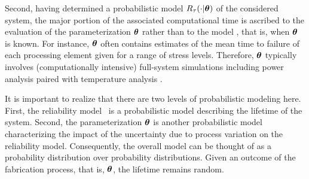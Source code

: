 Second, having determined a probabilistic model $R_\tau(\cdot | \bm{\theta})$ of the considered system, the major portion of the associated computational time is ascribed to the evaluation of the parameterization $\bm{\theta}$ rather than to the model \perse, that is, when $\bm{\theta}$ is known.
For instance, $\bm{\theta}$ often contains estimates of the mean time to failure of each processing element given for a range of stress levels.
Therefore, $\bm{\theta}$ typically involves (computationally intensive) full-system simulations including power analysis paired with temperature analysis \cite{xiang2010}.

\begin{remark} 
It is important to realize that there are two levels of probabilistic modeling here.
First, the reliability model \perse\ is a probabilistic model describing the lifetime of the system.
Second, the parameterization $\bm{\theta}$ is another probabilistic model characterizing the impact of the uncertainty due to process variation on the reliability model.
Consequently, the overall model can be thought of as a probability distribution over probability distributions.
Given an outcome of the fabrication process, that is, $\bm{\theta}$, the lifetime remains random.
\end{remark}
